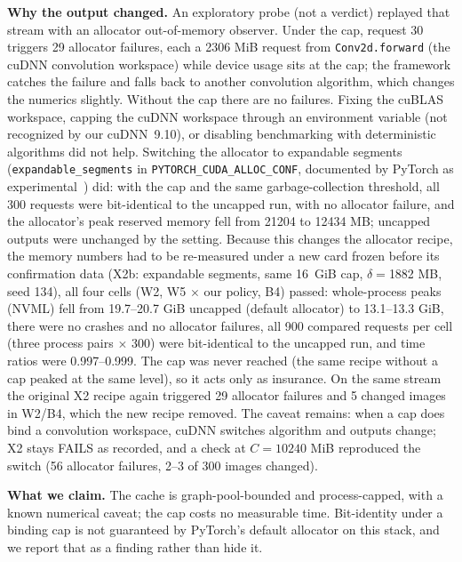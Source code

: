 \documentclass[conference]{IEEEtran}
\newcommand{\tn}[1]{#1}%
\begin{document}
\textbf{Why the output changed.} An exploratory probe (not a verdict) replayed that stream with an allocator out-of-memory observer. Under the cap, request 30 triggers \tn{29} allocator failures, each a \tn{2306} MiB request from \texttt{Conv2d.forward} (the cuDNN convolution workspace) while device usage sits at the cap; the framework catches the failure and falls back to another convolution algorithm, which changes the numerics slightly. Without the cap there are no failures. Fixing the cuBLAS workspace, capping the cuDNN workspace through an environment variable (not recognized by our cuDNN~9.10), or disabling benchmarking with deterministic algorithms did not help. Switching the allocator to expandable segments (\texttt{expandable\_segments} in \texttt{PYTORCH\_CUDA\_ALLOC\_CONF}, documented by PyTorch as experimental~\cite{pt_alloc_conf}) did: with the cap and the same garbage-collection threshold, all 300 requests were bit-identical to the uncapped run, with no allocator failure, and the allocator's peak reserved memory fell from \tn{21204} to \tn{12434} MB; uncapped outputs were unchanged by the setting. Because this changes the allocator recipe, the memory numbers had to be re-measured under a new card frozen before its confirmation data (X2b: expandable segments, same 16~GiB cap, $\delta{=}$\tn{1882} MB, seed 134), all four cells (W2, W5 $\times$ our policy, B4) passed: whole-process peaks (NVML) fell from \tn{19.7--20.7} GiB uncapped (default allocator) to \tn{13.1--13.3} GiB, there were no crashes and no allocator failures, all \tn{900} compared requests per cell (three process pairs $\times$ 300) were bit-identical to the uncapped run, and time ratios were \tn{0.997--0.999}. The cap was never reached (the same recipe without a cap peaked at the same level), so it acts only as insurance. On the same stream the original X2 recipe again triggered \tn{29} allocator failures and \tn{5} changed images in W2/B4, which the new recipe removed. The caveat remains: when a cap does bind a convolution workspace, cuDNN switches algorithm and outputs change; X2 stays FAILS as recorded, and a check at $C{=}10240$ MiB reproduced the switch (\tn{56} allocator failures, \tn{2--3} of 300 images changed).

\textbf{What we claim.} The cache is graph-pool-bounded and process-capped, with a known numerical caveat; the cap costs no measurable time. Bit-identity under a binding cap is not guaranteed by PyTorch's default allocator on this stack, and we report that as a finding rather than hide it.
\end{document}
